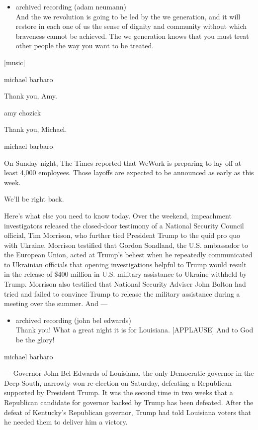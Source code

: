 \begin{itemize}
\tightlist
\item
  archived recording (adam neumann)\\
  And the we revolution is going to be led by the we generation, and it
  will restore in each one of us the sense of dignity and community
  without which braveness cannot be achieved. The we generation knows
  that you must treat other people the way you want to be treated.
\end{itemize}

{[}music{]}

michael barbaro

Thank you, Amy.

amy chozick

Thank you, Michael.

michael barbaro

On Sunday night, The Times reported that WeWork is preparing to lay off
at least 4,000 employees. Those layoffs are expected to be announced as
early as this week.

We'll be right back.

Here's what else you need to know today. Over the weekend, impeachment
investigators released the closed-door testimony of a National Security
Council official, Tim Morrison, who further tied President Trump to the
quid pro quo with Ukraine. Morrison testified that Gordon Sondland, the
U.S. ambassador to the European Union, acted at Trump's behest when he
repeatedly communicated to Ukrainian officials that opening
investigations helpful to Trump would result in the release of \$400
million in U.S. military assistance to Ukraine withheld by Trump.
Morrison also testified that National Security Adviser John Bolton had
tried and failed to convince Trump to release the military assistance
during a meeting over the summer. And ---

\begin{itemize}
\tightlist
\item
  archived recording (john bel edwards)\\
  Thank you! What a great night it is for Louisiana. {[}APPLAUSE{]} And
  to God be the glory!
\end{itemize}

michael barbaro

--- Governor John Bel Edwards of Louisiana, the only Democratic governor
in the Deep South, narrowly won re-election on Saturday, defeating a
Republican supported by President Trump. It was the second time in two
weeks that a Republican candidate for governor backed by Trump has been
defeated. After the defeat of Kentucky's Republican governor, Trump had
told Louisiana voters that he needed them to deliver him a victory.

